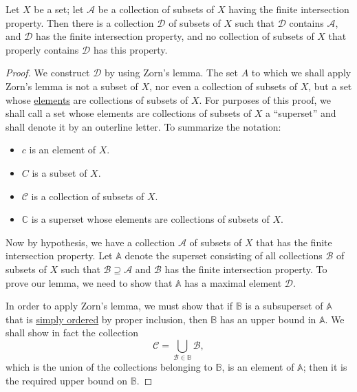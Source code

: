 \begin{lemma}
  Let \( X \) be a set;
  let \( \mathcal{A} \) be a collection of subsets of \( X \) having the finite intersection property.
  Then there is a collection \( \mathcal{D} \) of subsets of \( X \) such that \( \mathcal{D} \) contains \( \mathcal{A} \), and \( \mathcal{D} \) has the finite intersection property, and no collection of subsets of \( X \) that properly contains \( \mathcal{D} \) has this property.
\end{lemma}
\begin{proof}
  We construct \( \mathcal{D} \) by using Zorn's lemma.
  The set \( A \) to which we shall apply Zorn's lemma is not a subset of \( X \), nor even a collection of subsets of \( X \), but a set whose \underline{elements} are collections of subsets of \( X \).
  For purposes of this proof, we shall call a set whose elements are collections of subsets of \( X \) a ``superset'' and shall denote it by an outerline letter.
  To summarize the notation:
  \begin{itemize}
    \item \( c \) is an element of \( X \).
    \item \( C \) is a subset of \( X \).
    \item \( \mathcal{C} \) is a collection of subsets of \( X \).
    \item \( \mathbb{C} \) is a superset whose elements are collections of subsets of \( X \).
  \end{itemize}
  Now by hypothesis, we have a collection \( \mathcal{A} \) of subsets of \( X \) that has the finite intersection property.
  Let \( \mathbb{A} \) denote the superset consisting of all collections \( \mathcal{B} \) of subsets of \( X \) such that \( \mathcal{B} \supseteq \mathcal{A} \) and \( \mathcal{B} \) has the finite intersection property.
  To prove our lemma, we need to show that \( \mathbb{A} \) has a maximal element \( \mathcal{D} \).

  In order to apply Zorn's lemma, we must show that if \( \mathbb{B} \) is a subsuperset of \( \mathbb{A} \) that is \underline{simply ordered} by proper inclusion, then \( \mathbb{B} \) has an upper bound in \( \mathbb{A} \).
  We shall show in fact the collection
  \[
    \mathcal{C} = \bigcup_{\mathcal{B} \in \mathbb{B}}\mathcal{B},
  \]
  which is the union of the collections belonging to \( \mathbb{B} \), is an element of \( \mathbb{A} \); then it is the required upper bound on \( \mathbb{B} \).


\end{proof}
